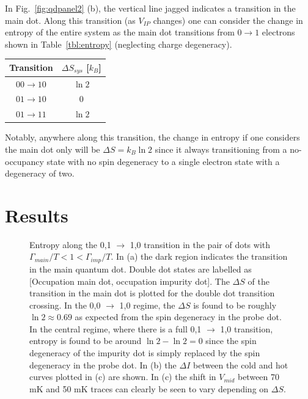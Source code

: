 In Fig.~\ref{fig:qdpanel2} (b), the vertical line jagged indicates a transition in the main dot. Along this transition (as $V_{IP}$ changes) one can consider the change in entropy of the entire system as the main dot transitions from $0 \to 1$ electrons shown in Table~\ref{tbl:entropy} (neglecting charge degeneracy).
\begin{center}
	\begin{tabular}{ |c|c| } 
		\hline
		Transition & $\Delta S_{sys}$ [$k_B$]  \\ \hline\hline
		$00 \to 10$ & $\ln 2$  \\ 
		$01 \to 10$ & 0 \\ 
		$01 \to 11$ & $\ln 2$ \\ 
		\hline
		\end{tabular}
		\label{tbl:entropy}
\end{center}
Notably, anywhere along this transition, the change in entropy if one considers the main dot only will be $\Delta S = k_B \ln 2$ since it always transitioning from a no-occupancy state with no spin degeneracy to a single electron state with a degeneracy of two.

\section{Results}
\label{sec:results}


\begin{figure}[h]
\centering
{}
\caption{Entropy along the 0,1 $\to$ 1,0 transition in the pair of dots with $\Gamma_{main}/T < 1 < \Gamma_{imp}/T$. In (a) the dark region indicates the transition in the main quantum dot. Double dot states are labelled as [Occupation main dot, occupation impurity dot]. The $\Delta S$ of the transition in the main dot is plotted for the double dot transition crossing. In the 0,0 $\to$ 1,0 regime, the $\Delta S$ is found to be roughly $\ln 2 \approx 0.69$ as expected from the spin degeneracy in the probe dot. In the central regime, where there is a full 0,1 $\to$ 1,0 transition, entropy is found to be around $\ln 2 - \ln2 = 0$ since the spin degeneracy of the impurity dot is simply replaced by the spin degeneracy in the probe dot. In (b) the $\Delta I$ between the cold and hot curves plotted in (c) are shown. In (c) the shift in $V_{mid}$ between 70 mK and 50 mK traces can clearly be seen to vary depending on $\Delta S$.}
\label{fig:largeg}       %
\end{figure}

